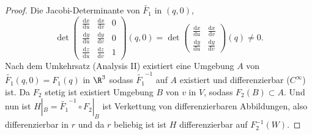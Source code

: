 \begin{remark}
\begin{proof}
    Die Jacobi-Determinante von \( \widetilde{F_1} \) in \( (q,0) \),
    \begin{equation*}
      \det \begin{pmatrix}
        \frac{\text{d}x}{\text{d}u} & \frac{\text{d}x}{\text{d}v} & 0 \\
        \frac{\text{d}y}{\text{d}u} & \frac{\text{d}y}{\text{d}v} & 0 \\
        \frac{\text{d}z}{\text{d}u} & \frac{\text{d}z}{\text{d}v} & 1
      \end{pmatrix}(q,0) = \det \begin{pmatrix}
        \frac{\text{d}x}{\text{d}u} & \frac{\text{d}x}{\text{d}v} \\
        \frac{\text{d}y}{\text{d}u} & \frac{\text{d}y}{\text{d}v}
      \end{pmatrix}(q) \neq 0\text{.}
    \end{equation*}
    Nach dem Umkehrsatz (Analysis II) existiert eine Umgebung \( A \) von \( \widetilde{F_1}(q,0) = F_1(q) \) in \( \R^3 \) sodass \( \widetilde{F_1}^{-1} \) auf \( A \) existiert und differenzierbar (\( C^\infty \)) ist. Da \( F_2 \) stetig ist existiert Umgebung \( B \) von \( v \) in \( V \), sodass \( F_2(B) \subset A \). Und nun ist \( H|_B = \widetilde{F_1}^{-1} \circ F_2|_B \) ist Verkettung von differenzierbaren Abbildungen, also differenzierbar in \( r \) und da \( r \) beliebig ist ist \( H \) differenzierbar auf \( F_2^{-1}(W) \). 
  \end{proof}
\end{remark}

